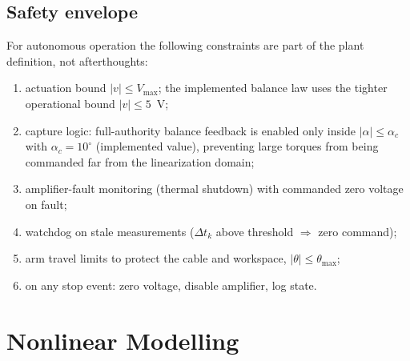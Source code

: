 \documentclass[conference]{IEEEtran}
\begin{document}
\subsection{Safety envelope}\label{sec:safety}
For autonomous operation the following constraints are part of the plant definition, not afterthoughts:
\begin{enumerate}[label=\arabic*)]
\item actuation bound $|v| \le V_{\max}$; the implemented balance law uses the tighter operational bound $|v|\le 5$~V;
\item capture logic: full-authority balance feedback is enabled only inside $|\alpha| \le \alpha_c$ with $\alpha_c = 10^\circ$ (implemented value), preventing large torques from being commanded far from the linearization domain;
\item amplifier-fault monitoring (thermal shutdown) with commanded zero voltage on fault;
\item watchdog on stale measurements ($\Delta t_k$ above threshold $\Rightarrow$ zero command);
\item arm travel limits to protect the cable and workspace, $|\theta|\le\theta_{\max}$;
\item on any stop event: zero voltage, disable amplifier, log state.
\end{enumerate}

\section{Nonlinear Modelling}\label{sec:model}
\end{document}
